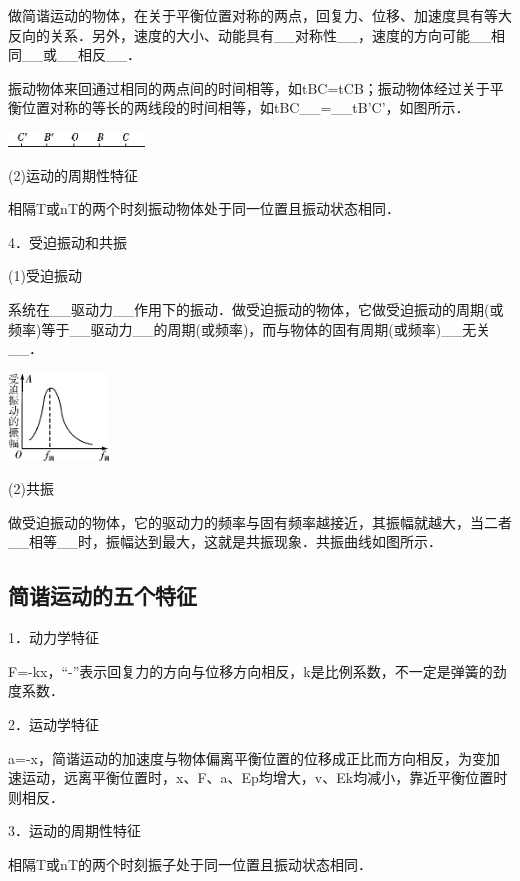 做简谐运动的物体，在关于平衡位置对称的两点，回复力、位移、加速度具有等大反向的关系．另外，速度的大小、动能具有\_\_对称性\_\_，速度的方向可能\_\_相同\_\_或\_\_相反\_\_．

振动物体来回通过相同的两点间的时间相等，如tBC=tCB；振动物体经过关于平衡位置对称的等长的两线段的时间相等，如tBC\_\_=\_\_tB'C'，如图所示．

\begin{center}\includegraphics[width=1.42431in,height=0.14167in]{media/image512.png}\end{center}
(2)运动的周期性特征

相隔T或nT的两个时刻振动物体处于同一位置且振动状态相同．

4．受迫振动和共振

(1)受迫振动

系统在\_\_驱动力\_\_作用下的振动．做受迫振动的物体，它做受迫振动的周期(或频率)等于\_\_驱动力\_\_的周期(或频率)，而与物体的固有周期(或频率)\_\_无关\_\_．

\begin{center}\includegraphics[width=1.04722in,height=0.91528in]{media/image513.png}\end{center}
(2)共振

做受迫振动的物体，它的驱动力的频率与固有频率越接近，其振幅就越大，当二者\_\_相等\_\_时，振幅达到最大，这就是共振现象．共振曲线如图所示．
\subsection{简谐运动的五个特征}

1．动力学特征

F=-kx，``-''表示回复力的方向与位移方向相反，k是比例系数，不一定是弹簧的劲度系数．

2．运动学特征

a=-x，简谐运动的加速度与物体偏离平衡位置的位移成正比而方向相反，为变加速运动，远离平衡位置时，x、F、a、Ep均增大，v、Ek均减小，靠近平衡位置时则相反．

3．运动的周期性特征

相隔T或nT的两个时刻振子处于同一位置且振动状态相同．

